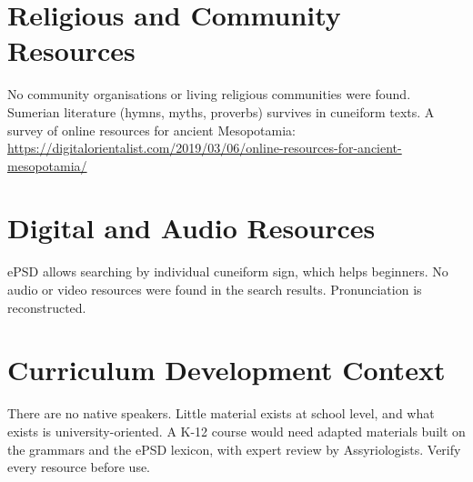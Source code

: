 \documentclass[12pt]{article}
\begin{document}
\section{Religious and Community Resources}
No community organisations or living religious communities were found. Sumerian literature (hymns, myths, proverbs) survives in cuneiform texts. A survey of online resources for ancient Mesopotamia: \url{https://digitalorientalist.com/2019/03/06/online-resources-for-ancient-mesopotamia/}

\section{Digital and Audio Resources}
ePSD allows searching by individual cuneiform sign, which helps beginners. No audio or video resources were found in the search results. Pronunciation is reconstructed.

\section{Curriculum Development Context}
There are no native speakers. Little material exists at school level, and what exists is university-oriented. A K-12 course would need adapted materials built on the grammars and the ePSD lexicon, with expert review by Assyriologists. Verify every resource before use.
\end{document}

